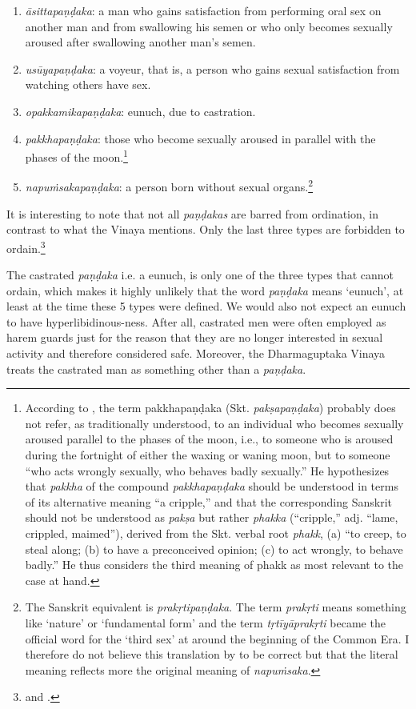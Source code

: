 \begin{enumerate}
\item {\em āsittapaṇḍaka}: a man who gains satisfaction from performing oral sex on another man and from swallowing his semen or who only becomes sexually aroused after swallowing another man’s semen. 
\item {\em usūyapaṇḍaka}: a voyeur, that is, a person who gains sexual satisfaction from watching others have sex. 
\item {\em opakkamikapaṇḍaka}: eunuch, due to castration.
\item {\em pakkhapaṇḍaka}: those who become sexually aroused in parallel with the phases of the moon.\footnote{According to \cite{bomhard}, the term pakkhapaṇḍaka (Skt. {\em pakṣapaṇḍaka}) probably does not refer, as traditionally understood, to an individual who becomes sexually aroused parallel to the phases of the moon, i.e., to someone who is aroused during the fortnight of either the waxing or waning moon, but to someone “who acts wrongly sexually, who behaves badly sexually.” He hypothesizes that {\em pakkha} of the compound {\em pakkhapaṇḍaka} should be understood in terms of its alternative meaning “a cripple,” and that the corresponding Sanskrit should not be understood as {\em pakṣa} but rather {\em phakka} (“cripple,” adj. “lame, crippled, maimed”), derived from the Skt. verbal root {\em phakk}, (a) “to creep, to steal along; (b) to have a preconceived opinion; (c) to act wrongly, to behave badly.” He thus considers the third meaning of phakk as most relevant to the case at hand.}
\item {\em napuṁsakapaṇḍaka}: a person born without sexual organs.\footnote{The Sanskrit equivalent is {\em prakṛtipaṇḍaka}. The term {\em prakṛti} means something like `nature' or `fundamental form' and the term {\em tṛtīyāprakṛti} became the official word for the `third sex' at around the beginning of the Common Era. I therefore do not believe this translation by \cite{thanissaro} to be correct but that the literal meaning reflects more the original meaning of {\em napuṁsaka}.} 
\end{enumerate}

It is interesting to note that not all {\em paṇḍakas} are barred from ordination, in contrast to what the Vinaya mentions. Only the last three types are forbidden to ordain.\footnote{\cite{wong} and \cite{thanissaro}.}

The castrated {\em paṇḍaka} i.e. a eunuch, is only one of the three types that cannot ordain, which makes it highly unlikely that the word {\em paṇḍaka} means `eunuch', at least at the time these 5 types were defined. We would also not expect an eunuch to have hyperlibidinous-ness. After all, castrated men were often employed as harem guards just for the reason that they are no longer interested in sexual activity and therefore considered safe. Moreover, the Dharmaguptaka Vinaya treats the castrated man as something other than a {\em paṇḍaka}.

